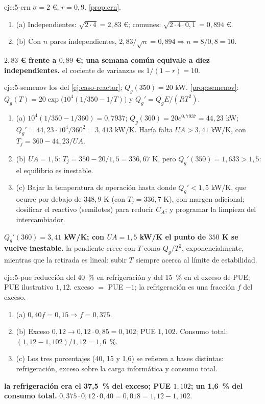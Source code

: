 \begin{solucion}{eje:5-crn}
\datos $\sigma=2$ €; $r=0{,}9$.
\planteamiento \cref{prop:crn}.
\pasos
\begin{enumerate}[label=\arabic*.]
  \item (a) Independientes: $\sqrt{2\cdot4}=2{,}83$ €; comunes: $\sqrt{2\cdot4\cdot0{,}1}=0{,}894$ €.
  \item (b) Con $n$ pares independientes, $2{,}83/\sqrt n=0{,}894\Rightarrow n=8/0{,}8=10$.
\end{enumerate}
\resultado \textbf{$2{,}83$ € frente a $0{,}89$ €; una semana común equivale a diez independientes.}
\comprobacion el cociente de varianzas es $1/(1-r)=10$.
\end{solucion}

\begin{solucion}{eje:5-semenov}
\datos los del \cref{ej:caso-reactor}; $Q_g(350)=20$ kW.
\planteamiento \cref{prop:semenov}: $Q_g(T)=20\exp\bigl(10^{4}(1/350-1/T)\bigr)$ y $Q_g'=Q_gE/(RT^{2})$.
\pasos
\begin{enumerate}[label=\arabic*.]
  \item (a) $10^{4}(1/350-1/360)=0{,}7937$; $Q_g(360)=20e^{0{,}7937}=44{,}23$ kW; $Q_g'=44{,}23\cdot10^{4}/360^{2}=3{,}413$ kW/K. Haría falta $UA>3{,}41$ kW/K, con $T_j=360-44{,}23/UA$.
  \item (b) $UA=1{,}5$: $T_j=350-20/1{,}5=336{,}67$ K, pero $Q_g'(350)=1{,}633>1{,}5$: el equilibrio es inestable.
  \item (c) Bajar la temperatura de operación hasta donde $Q_g'<1{,}5$ kW/K, que ocurre por debajo de $348{,}9$ K (con $T_j=336{,}7$ K), con margen adicional; dosificar el reactivo (semilotes) para reducir $C_A$; y programar la limpieza del intercambiador.
\end{enumerate}
\resultado \textbf{$Q_g'(360)=3{,}41$ kW/K; con $UA=1{,}5$ kW/K el punto de $350$ K se vuelve inestable.}
\comprobacion la pendiente crece con $T$ como $Q_g/T^{2}$, exponencialmente, mientras que la retirada es lineal: subir $T$ siempre acerca al límite de estabilidad.
\end{solucion}

\begin{solucion}{eje:5-pue}
\datos reducción del 40~\% en refrigeración y del 15~\% en el exceso de PUE; PUE ilustrativo $1{,}12$.
\planteamiento exceso $=$ PUE $-1$; la refrigeración es una fracción $f$ del exceso.
\pasos
\begin{enumerate}[label=\arabic*.]
  \item (a) $0{,}40f=0{,}15\Rightarrow f=0{,}375$.
  \item (b) Exceso $0{,}12\to0{,}12\cdot0{,}85=0{,}102$; PUE $1{,}102$. Consumo total: $(1{,}12-1{,}102)/1{,}12=1{,}6$~\%.
  \item (c) Los tres porcentajes (40, 15 y 1,6) se refieren a bases distintas: refrigeración, exceso sobre la carga informática y consumo total.
\end{enumerate}
\resultado \textbf{la refrigeración era el 37,5~\% del exceso; PUE $1{,}102$; un 1,6~\% del consumo total.}
\comprobacion $0{,}375\cdot0{,}12\cdot0{,}40=0{,}018=1{,}12-1{,}102$.
\end{solucion}

